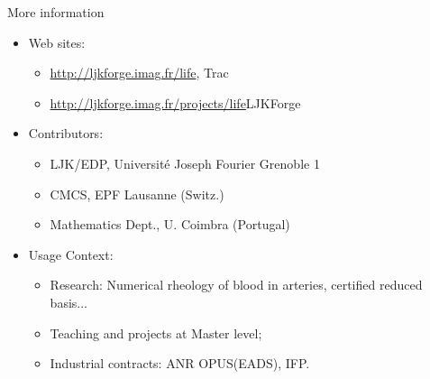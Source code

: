 \documentclass[final,utf8,,hyperref={pdfpagelabels=false}]{beamer}
\begin{document}
\begin{frame}[containsverbatim]{}
\begin{columns}[c]
  
    \begin{block}{More information}
      \begin{itemize}
      \item Web sites:
        \begin{itemize}
        \item \url{http://ljkforge.imag.fr/life}, \hfill{Trac}
        \item \url{http://ljkforge.imag.fr/projects/life}\hfill{LJKForge}
        \end{itemize}
      \item Contributors:
        \begin{itemize}
        \item LJK/EDP, Université Joseph Fourier Grenoble 1
        \item CMCS, EPF Lausanne (Switz.)
        \item Mathematics Dept., U. Coimbra (Portugal)
        \end{itemize}
      \item Usage Context:
        \begin{itemize}
        \item Research: Numerical rheology of blood in arteries, certified
          reduced basis...
        \item Teaching and projects at Master level;
        \item Industrial contracts: ANR OPUS(EADS), IFP.
        \end{itemize}
      \end{itemize}

      

    \end{block}
  

\end{columns}
\end{frame}
\end{document}
